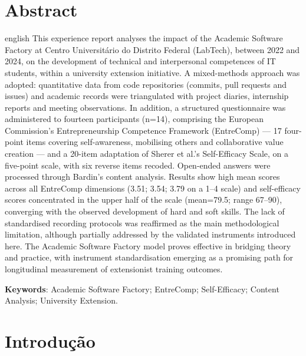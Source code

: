 \documentclass[12pt,a4paper]{article}
\begin{document}
\section*{Abstract}
\begin{otherlanguage*}{english}
This experience report analyses the impact of the Academic Software
Factory at Centro Universit\'ario do Distrito Federal (LabTech), between
2022 and 2024, on the development of technical and interpersonal
competences of IT students, within a university extension initiative. A
mixed-methods approach was adopted: quantitative data from code
repositories (commits, pull requests and issues) and academic records
were triangulated with project diaries, internship reports and meeting
observations. In addition, a structured questionnaire was administered
to fourteen participants (n=14), comprising the European Commission's
Entrepreneurship Competence Framework (EntreComp) --- 17 four-point items
covering self-awareness, mobilising others and collaborative value
creation --- and a 20-item adaptation of Sherer et al.'s Self-Efficacy
Scale, on a five-point scale, with six reverse items recoded. Open-ended answers
were processed through Bardin's content analysis. Results show high mean
scores across all EntreComp dimensions (3.51; 3.54; 3.79 on a 1--4
scale) and self-efficacy scores concentrated in the upper half of the
scale (mean=79.5; range 67--90), converging with the observed
development of hard and soft skills. The lack of standardised recording
protocols was reaffirmed as the main methodological limitation, although
partially addressed by the validated instruments introduced here. The
Academic Software Factory model proves effective in bridging theory and
practice, with instrument standardisation emerging as a promising path
for longitudinal measurement of extensionist training outcomes.

\vspace{\baselineskip}\noindent
\textbf{Keywords}: Academic Software Factory; EntreComp; Self-Efficacy;
Content Analysis; University Extension.
\end{otherlanguage*}

\newpage

\section{Introdu\c{c}\~ao}
\label{sec:introducao}
\end{document}

